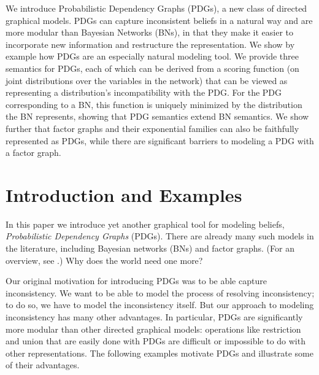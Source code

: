 We introduce Probabilistic Dependency Graphs (PDGs), a new class of
directed graphical models. PDGs can capture inconsistent beliefs in a
natural way and are more modular than Bayesian Networks (BNs), in that
they make it easier to incorporate new information and restructure the  
representation. We show by example how PDGs are an especially natural
modeling tool.
We provide three semantics for PDGs, each of which can be derived from a
scoring function (on joint distributions over the
variables in the network) that can be viewed as representing a
distribution's incompatibility with the PDG.
For the PDG corresponding
to a BN, this function is uniquely minimized by the distribution the
BN represents, showing that PDG semantics extend BN semantics.  
We show further that factor graphs
and their exponential families
can also be faithfully represented as PDGs,
while there are significant barriers to modeling a PDG with a factor graph.

\section{Introduction and Examples}

In this paper we introduce yet another graphical
tool
for modeling beliefs,
\emph{Probabilistic Dependency Graphs} (PDGs). There are already many
such models in the literature, including Bayesian networks (BNs) and
factor graphs. (For an overview, see 
\citet{KF09}.)
Why does the world need one more?  

Our original motivation for introducing PDGs was to be able capture
inconsistency. We want to be able to model the process of resolving
inconsistency; to do so, we have to model the inconsistency itself. But our
approach to modeling inconsistency has many other advantages. In particular,
PDGs are significantly more modular than other directed graphical models:
operations like restriction and union that are easily done with PDGs are
difficult or impossible to do with other representations.
The following examples motivate PDGs and illustrate some of
their advantages.


